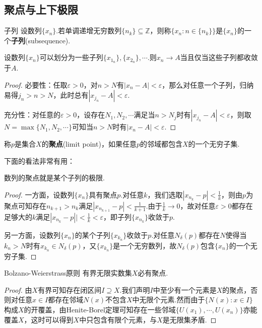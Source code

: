 \documentclass[lang=cn, zihao=5]{elegantbook}
\begin{document}
\subsection{聚点与上下极限}

\begin{definition}{子列}
	设数列$\{ x_n \}$.若单调递增无穷数列$\{ n_k \} \subseteq \mathbb{Z}$，则称$\{ x_n:n \in  \{ n_k \} \}$是$\{ x_n \}$的一个\textbf{子列}(subsequence).
\end{definition}

\begin{proposition}
	设数列$\{ x_n \}$可以划分为一些子列$\{ x_{1_n} \},\{ x_{2_n} \},\cdots$.则$x_n \to A$当且仅当这些子列都收敛于$A$.
\end{proposition}
\begin{proof}
	必要性：任取$\varepsilon >0$，对$n>N$有$|x_n-A|<\varepsilon$，那么对任意一个子列，归纳易得$j_n>n>N$，此时总有$|x_{j_n}-A|<\varepsilon$.
	
	充分性：对任意的$\varepsilon >0$，设存在$N_1,N_2,\cdots$满足当$n>N_j$时有$|x_{j_n}-A|<\varepsilon$，则取$N=\max \{ N_1,N_2,\cdots \}$可知当$n>N$时有$|x_n-A|<\varepsilon$.
\end{proof}

\begin{definition}
	称$p$是集合$X$的\textbf{聚点}(limit point)，如果任意$p$的邻域都包含$X$的一个无穷子集.
\end{definition}

下面的看法非常有用：

\begin{proposition}
	数列的聚点就是某个子列的极限.
\end{proposition}
\begin{proof}
	一方面，设数列$\{ x_n \}$具有聚点$p$.对任意$k$，我们选取$|x_{n_k}-p|<\frac{1}{k}$，则由$p$为聚点可知存在$n_{k+1}>n_k$满足$|x_{n_{k+1}}-p|<\frac{1}{k+1}$.由于$\frac{1}{k} \to 0$，故对任意$\varepsilon >0$都存在足够大的$k$满足$|x_{n_k}-p||<\frac{1}{k}<\varepsilon$，即子列$\{ x_{n_k} \}$收敛于$p$.
	
	另一方面，设数列$\{ x_n \}$的某个子列$\{ x_{k_n} \}$收敛于$p$.对任意$N_{\delta}(p)$都存在$N$使得当$k_n>N$时有$x_{k_n} \in N_{\delta}(p)$，又$\{ x_{k_n} \}$是一个无穷数列，故$N_{\delta}(p)$包含$\{ x_n \}$的一个无穷子集.
\end{proof}

\begin{lemma}{Bolzano-Weierstrass原则}
	有界无限实数集$X$必有聚点.
\end{lemma}
\begin{proof}
	由$X$有界可知存在闭区间$I \supseteq X$.我们声明$I$中至少有一个元素是$X$的聚点，否则对任意$x \in I$都存在邻域$N(x)$不包含$X$中无限个元素.然而由于$\{ N(x):x \in I \}$构成$X$的开覆盖，由Henite-Borel定理可知存在一些邻域$\{ U(x_1),\cdots ,U(x_n) \}$亦能覆盖$X$，这时可以得到$X$中只包含有限个元素，与$X$是无限集矛盾.
\end{proof}
\end{document}

